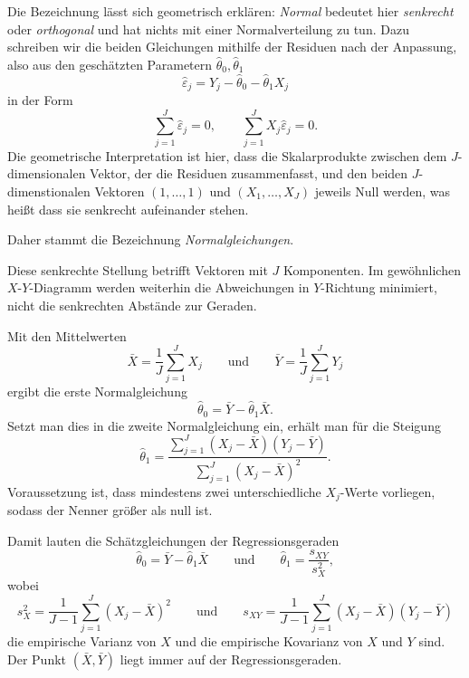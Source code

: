 Die Bezeichnung lässt sich geometrisch erklären:
\emph{Normal} bedeutet hier \emph{senkrecht} oder
\emph{orthogonal} und hat nichts mit einer Normalverteilung
zu tun. Dazu schreiben wir die beiden Gleichungen mithilfe
der Residuen nach der Anpassung, also aus den geschätzten Parametern $\hat\theta_0, \hat\theta_1$
\[
  \hat\varepsilon_j
  =Y_j-\hat\theta_0-\hat\theta_1X_j
\]
in der Form
\begin{equation}
  \sum_{j=1}^{J}\hat\varepsilon_j=0,
  \qquad
  \sum_{j=1}^{J}X_j\hat\varepsilon_j=0.
\end{equation}
Die geometrische Interpretation ist hier, dass die 
Skalarprodukte zwischen dem $J$-dimensionalen \mbox{Vektor}, der die Residuen 
zusammenfasst, und den beiden 
$J$-dimenstionalen Vektoren $(1,\ldots,1)$ und $(X_1,\ldots,X_J)$ 
jeweils Null werden, was heißt dass sie senkrecht aufeinander stehen.

Daher stammt die Bezeichnung \textsl{Normalgleichungen}.

Diese senkrechte Stellung betrifft Vektoren mit $J$
Komponenten. Im gewöhnlichen $X$-$Y$-Diagramm werden
weiterhin die Abweichungen in $Y$-Richtung minimiert,
nicht die senkrechten Abstände zur Geraden.

Mit den Mittelwerten
\[
  \bar X=\frac{1}{J}\sum_{j=1}^{J}X_j
  \qquad\text{und}\qquad
  \bar Y=\frac{1}{J}\sum_{j=1}^{J}Y_j
\]
ergibt die erste Normalgleichung
\begin{equation}
  \hat\theta_0=\bar Y-\hat\theta_1\bar X.
\end{equation}
Setzt man dies in die zweite Normalgleichung ein,
erhält man für die Steigung
\begin{equation}
  \hat\theta_1
  =
  \frac{\sum_{j=1}^{J}(X_j-\bar X)(Y_j-\bar Y)}
       {\sum_{j=1}^{J}(X_j-\bar X)^2}.
\end{equation}
Voraussetzung ist, dass mindestens zwei unterschiedliche
$X_j$-Werte vorliegen, sodass der Nenner größer als null ist.

Damit lauten die Schätzgleichungen der Regressionsgeraden
\begin{equation}
  \hat\theta_0=\bar Y-\hat\theta_1\bar X
  \qquad\text{und}\qquad
  \hat\theta_1=\frac{s_{XY}}{s_X^2},
  \label{eq:Lineare_Regressionskonstanten}
\end{equation}
wobei
\[
  s_X^2
  =\frac{1}{J-1}\sum_{j=1}^{J}(X_j-\bar X)^2
  \qquad\text{und}\qquad
  s_{XY}
  =\frac{1}{J-1}
    \sum_{j=1}^{J}(X_j-\bar X)(Y_j-\bar Y)
\]
die empirische Varianz von $X$ und die empirische
Kovarianz von $X$ und $Y$ sind. Der Punkt
$(\bar X,\bar Y)$ liegt immer auf der Regressionsgeraden.


